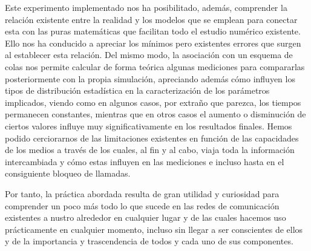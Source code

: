		Este experimento implementado nos ha posibilitado, además, comprender la relación existente entre la realidad y los modelos que se emplean para conectar esta con las puras matemáticas que facilitan todo el estudio numérico existente. Ello nos ha conducido a apreciar los mínimos pero existentes errores que surgen al establecer esta relación. Del mismo modo, la asociación con un esquema de colas nos permite calcular de forma teórica algunas mediciones para compararlas posteriormente con la propia simulación, apreciando además cómo influyen los tipos de distribución estadística en la caracterización de los parámetros implicados, viendo como en algunos casos, por extraño que parezca, los tiempos permanecen constantes, mientras que en otros casos el aumento o disminución de ciertos valores influye muy significativamente en los resultados finales. Hemos podido cerciorarnos de las limitaciones existentes en función de las capacidades de los medios a través de los cuales, al fin y al cabo, viaja toda la información intercambiada y cómo estas influyen en las mediciones e incluso hasta en el consiguiente bloqueo de llamadas.

		Por tanto, la práctica abordada resulta de gran utilidad y curiosidad para comprender un poco más todo lo que sucede en las redes de comunicación existentes a nustro alrededor en cualquier lugar y de las cuales hacemos uso prácticamente en cualquier momento, incluso sin llegar a ser conscientes de ellos y de la importancia y trascendencia de todos y cada uno de sus componentes.
